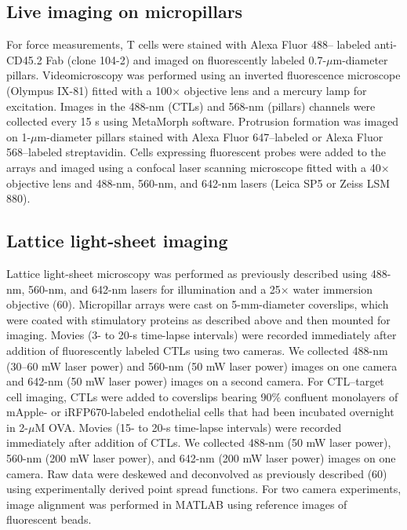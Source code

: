 \subsection{Live imaging on micropillars}
For force measurements, T cells were stained with Alexa Fluor 488– labeled anti-CD45.2 Fab (clone 104-2) and imaged on fluorescently labeled 0.7-$\mu$m-diameter pillars. Videomicroscopy was performed using an inverted fluorescence microscope (Olympus IX-81) fitted with a 100× objective lens and a mercury lamp for excitation. Images in the 488-nm (CTLs) and 568-nm (pillars) channels were collected every 15 s using MetaMorph software. Protrusion formation was imaged on 1-$\mu$m-diameter pillars stained with Alexa Fluor 647–labeled or Alexa Fluor 568–labeled streptavidin. Cells expressing fluorescent probes were added to the arrays and imaged using a confocal laser scanning microscope fitted with a 40× objective lens and 488-nm, 560-nm, and 642-nm lasers (Leica SP5 or Zeiss LSM 880).

\subsection{Lattice light-sheet imaging}
Lattice light-sheet microscopy was performed as previously described using 488-nm, 560-nm, and 642-nm lasers for illumination and a 25× water immersion objective (60). Micropillar arrays were cast on 5-mm-diameter coverslips, which were coated with stimulatory proteins as described above and then mounted for imaging. Movies (3- to 20-s time-lapse intervals) were recorded immediately after addition of fluorescently labeled CTLs using two cameras. We collected 488-nm (30–60 mW laser power) and 560-nm (50 mW laser power) images on one camera and 642-nm (50 mW laser power) images on a second camera. For CTL–target cell imaging, CTLs were added to coverslips bearing 90\% confluent monolayers of mApple- or iRFP670-labeled endothelial cells that had been incubated overnight in 2-$\mu$M OVA. Movies (15- to 20-s time-lapse intervals) were recorded immediately after addition of CTLs. We collected 488-nm (50 mW laser power), 560-nm (200 mW laser power), and 642-nm (200 mW laser power) images on one camera. Raw data were deskewed and deconvolved as previously described (60) using experimentally derived point spread functions. For two camera experiments, image alignment was performed in MATLAB using reference images of fluorescent beads.

